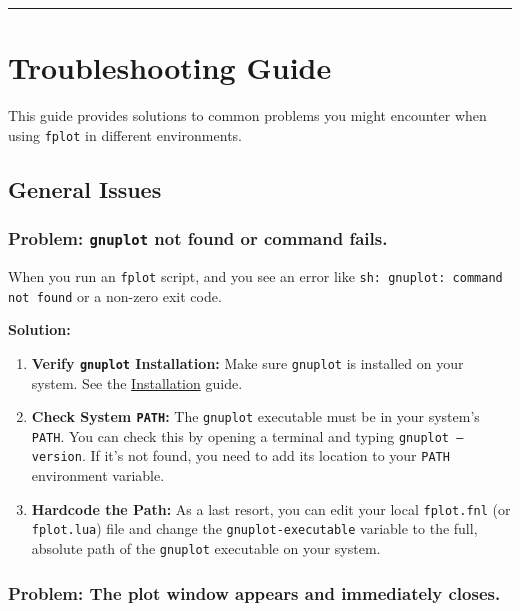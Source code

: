 \documentclass[12pt, letterpaper]{article}
\begin{document}
	\noindent\rule{\textwidth}{0.4pt}
	
	\newpage
	
	\section{Troubleshooting Guide}
	
	This guide provides solutions to common problems you might encounter when using \texttt{fplot} in different environments.
	
	\subsection{General Issues}
	
	\subsubsection*{Problem: \texttt{gnuplot} not found or command fails.}
	
	When you run an \texttt{fplot} script, and you see an error like \texttt{sh: gnuplot: command not found} or a non-zero exit code.
	
	\textbf{Solution:}
	
	\begin{enumerate}
		\item \textbf{Verify \texttt{gnuplot} Installation:} Make sure \texttt{gnuplot} is installed on your system. See the \href{https://www.google.com/search?q=https://github.com/your-username/fplot/wiki/Installation}{Installation} guide.
		\item \textbf{Check System \texttt{PATH}:} The \texttt{gnuplot} executable must be in your system's \texttt{PATH}. You can check this by opening a terminal and typing \texttt{gnuplot --version}. If it's not found, you need to add its location to your \texttt{PATH} environment variable.
		\item \textbf{Hardcode the Path:} As a last resort, you can edit your local \texttt{fplot.fnl} (or \texttt{fplot.lua}) file and change the \texttt{gnuplot-executable} variable to the full, absolute path of the \texttt{gnuplot} executable on your system.
	\end{enumerate}
	
	\subsubsection*{Problem: The plot window appears and immediately closes.}
	
\end{document}
